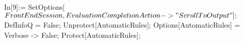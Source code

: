 In[9]:= SetOptions[$FrontEndSession, EvaluationCompletionAction -> "ScrollToOutput"]; $DefInfoQ = False; Unprotect[AutomaticRules]; Options[AutomaticRules] = {Verbose -> False}; Protect[AutomaticRules]; 
